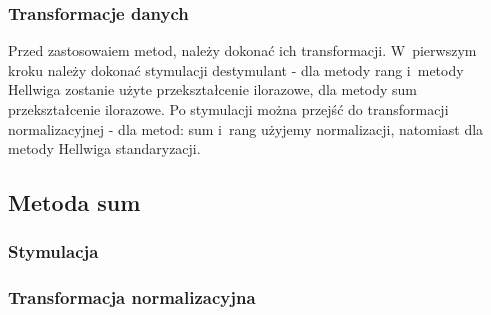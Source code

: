\documentclass[12pt,a4paper]{report}
\begin{document}
{\begin{Shaded}
\begin{Highlighting}[]
\NormalTok{dane_porzadkowanie<-zbior_danych[}\NormalTok{(}\NormalTok{,}\NormalTok{,}\NormalTok{,}
                                   \NormalTok{,}
                                   \NormalTok{,}\NormalTok{)]}
\end{Highlighting}
\end{Shaded}

\subsubsection{Transformacje danych}

Przed zastosowaiem metod, należy dokonać ich transformacji. W~pierwszym
kroku należy dokonać stymulacji destymulant - dla metody rang i~metody
Hellwiga zostanie użyte przekształcenie ilorazowe, dla metody sum
przekształcenie ilorazowe. Po stymulacji można przejść do transformacji
normalizacyjnej - dla metod: sum i~rang użyjemy normalizacji,
natomiast dla metody Hellwiga standaryzacji.


\subsection{Metoda sum}
\subsubsection{Stymulacja} 
\begin{Shaded}
\begin{Highlighting}[]
\NormalTok{)} 
\end{Highlighting}
\end{Shaded}

\subsubsection{Transformacja normalizacyjna}
\begin{Shaded}
\begin{Highlighting}[]
\end{Highlighting}
\end{Shaded}

}
\end{document}
